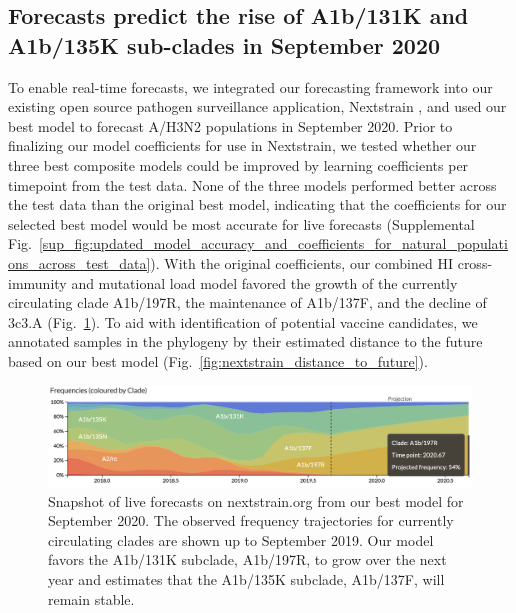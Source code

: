 \subsection*{Forecasts predict the rise of A1b/131K and A1b/135K sub-clades in September 2020}

To enable real-time forecasts, we integrated our forecasting framework into our existing open source pathogen surveillance application, Nextstrain \cite{Hadfield2018}, and used our best model to forecast A/H3N2 populations in September 2020.
Prior to finalizing our model coefficients for use in Nextstrain, we tested whether our three best composite models could be improved by learning coefficients per timepoint from the test data.
None of the three models performed better across the test data than the original best model, indicating that the coefficients for our selected best model would be most accurate for live forecasts (Supplemental Fig.~\ref{sup_fig:updated_model_accuracy_and_coefficients_for_natural_populations_across_test_data}).
With the original coefficients, our combined HI cross-immunity and mutational load model favored the growth of the currently circulating clade A1b/197R, the maintenance of A1b/137F, and the decline of 3c3.A (Fig.~\ref{fig:nextstrain_forecasts}).
To aid with identification of potential vaccine candidates, we annotated samples in the phylogeny by their estimated distance to the future based on our best model (Fig.~\ref{fig:nextstrain_distance_to_future}).

\begin{figure}[ht]
  \begin{center}
  \includegraphics[width=\textwidth]{figures/nextstrain-forecasts-for-september-2020.png}
  \caption{
    Snapshot of live forecasts on nextstrain.org from our best model for September 2020.
    The observed frequency trajectories for currently circulating clades are shown up to September 2019.
    Our model favors the A1b/131K subclade, A1b/197R, to grow over the next year and estimates that the A1b/135K subclade, A1b/137F, will remain stable.
  }
  \label{fig:nextstrain_forecasts}
  \end{center}
\end{figure}

